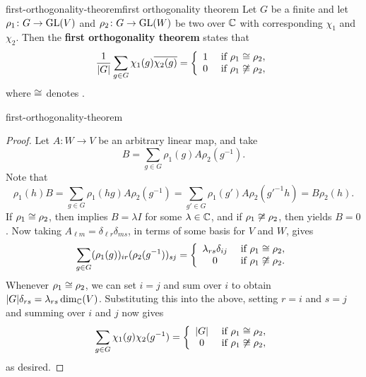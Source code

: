 \begin{topic}{first-orthogonality-theorem}{first orthogonality theorem}
    Let $G$ be a finite  and let $\rho_1 \colon G \to \textup{GL}(V)$ and $\rho_2 \colon G \to \textup{GL}(W)$ be two  over $\mathbb{C}$ with corresponding  $\chi_1$ and $\chi_2$. Then the \textbf{first orthogonality theorem} states that
    \[ \frac{1}{|G|} \sum_{g \in G} \chi_1(g) \overline{\chi_2(g)} = \left\{ \begin{array}{cl} 1 & \textup{ if } \rho_1 \cong \rho_2 , \\ 0 & \textup{ if } \rho_1 \not\cong \rho_2 , \end{array} \right. \]
    where $\cong$ denotes .
\end{topic}

\begin{example}{first-orthogonality-theorem}
    \begin{proof}
        Let $A \colon W \to V$ be an arbitrary linear map, and take
        \[ B = \sum_{g \in G} \rho_1(g) A \rho_2(g^{-1}) . \]
        Note that
        \[ \rho_1(h) B = \sum_{g \in G} \rho_1(hg) A \rho_2(g^{-1}) = \sum_{g' \in G} \rho_1(g') A \rho_2(g'^{-1} h) = B \rho_2(h) . \]
        If $\rho_1 \cong \rho_2$, then  implies $B = \lambda I$ for some $\lambda \in \mathbb{C}$, and if $\rho_1 \not\cong \rho_2$, then  yields $B = 0$. Now taking $A_{\ell m} = \delta_{\ell r} \delta_{ms}$, in terms of some basis for $V$ and $W$, gives
        \[ \sum_{g \in G} (\rho_1(g))_{ir} (\rho_2(g^{-1}))_{sj} = \left\{ \begin{array}{cl} \lambda_{rs} \delta_{ij} & \textup{ if } \rho_1 \cong \rho_2 , \\ 0 & \textup{ if } \rho_1 \not\cong \rho_2 . \end{array} \right. \]
        Whenever $\rho_1 \cong \rho_2$, we can set $i = j$ and sum over $i$ to obtain $|G| \delta_{rs} = \lambda_{rs} \dim_{\mathbb{C}}(V)$. Substituting this into the above, setting $r = i$ and $s = j$ and summing over $i$ and $j$ now gives
        \[ \sum_{g \in G} \chi_1(g) \chi_2(g^{-1}) = \left\{ \begin{array}{cl} |G| & \textup{ if } \rho_1 \cong \rho_2 , \\ 0 & \textup{ if } \rho_1 \not\cong \rho_2 , \end{array} \right. \]
        as desired.
    \end{proof}
\end{example}


